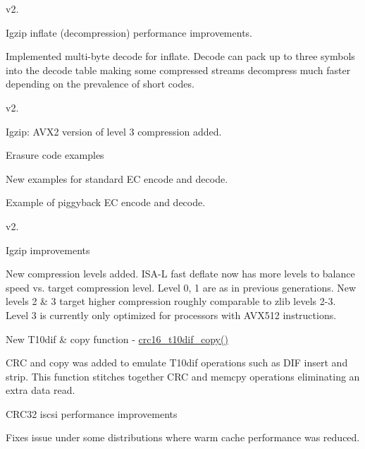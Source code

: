 v2.


\begin{DoxyItemize}
\item Igzip inflate (decompression) performance improvements.
\begin{DoxyItemize}
\item Implemented multi-\/byte decode for inflate. Decode can pack up to three symbols into the decode table making some compressed streams decompress much faster depending on the prevalence of short codes.
\end{DoxyItemize}
\end{DoxyItemize}

v2.


\begin{DoxyItemize}
\item Igzip\-: A\-V\-X2 version of level 3 compression added.
\item Erasure code examples
\begin{DoxyItemize}
\item New examples for standard E\-C encode and decode.
\item Example of piggyback E\-C encode and decode.
\end{DoxyItemize}
\end{DoxyItemize}

v2.


\begin{DoxyItemize}
\item Igzip improvements
\begin{DoxyItemize}
\item New compression levels added. I\-S\-A-\/\-L fast deflate now has more levels to balance speed vs. target compression level. Level 0, 1 are as in previous generations. New levels 2 \& 3 target higher compression roughly comparable to zlib levels 2-\/3. Level 3 is currently only optimized for processors with A\-V\-X512 instructions.
\end{DoxyItemize}
\item New T10dif \& copy function -\/ \hyperlink{crc_8h_ab1badb6bdc8bdfeb341280cdedeed4e6}{crc16\-\_\-t10dif\-\_\-copy()}
\begin{DoxyItemize}
\item C\-R\-C and copy was added to emulate T10dif operations such as D\-I\-F insert and strip. This function stitches together C\-R\-C and memcpy operations eliminating an extra data read.
\end{DoxyItemize}
\item C\-R\-C32 iscsi performance improvements
\begin{DoxyItemize}
\item Fixes issue under some distributions where warm cache performance was reduced.
\end{DoxyItemize}
\end{DoxyItemize}

